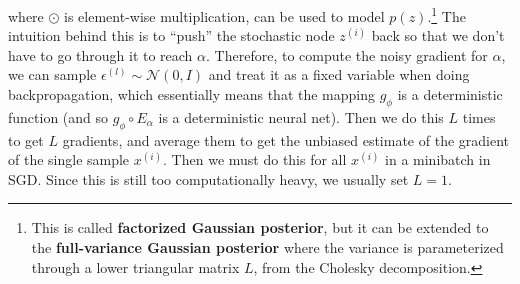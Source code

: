   where $\odot$ is element-wise multiplication, can be used to model $p(z)$.\footnote{This is called \textbf{factorized Gaussian posterior}, but it can be extended to the \textbf{full-variance Gaussian posterior} where the variance is parameterized through a lower triangular matrix $L$, from the Cholesky decomposition.} The intuition behind this is to ``push'' the stochastic node $z^{(i)}$ back so that we don't have to go through it to reach $\alpha$. Therefore, to compute the noisy gradient for $\alpha$, we can sample $\epsilon^{(l)} \sim \mathcal{N}(0, I)$ and treat it as a fixed variable when doing backpropagation, which essentially means that the mapping $g_\phi$ is a deterministic function (and so $g_\phi \circ E_\alpha$ is a deterministic neural net). Then we do this $L$ times to get $L$ gradients, and average them to get the unbiased estimate of the gradient of the single sample $x^{(i)}$. Then we must do this for all $x^{(i)}$ in a minibatch in SGD. Since this is still too computationally heavy, we usually set $L=1$. 

